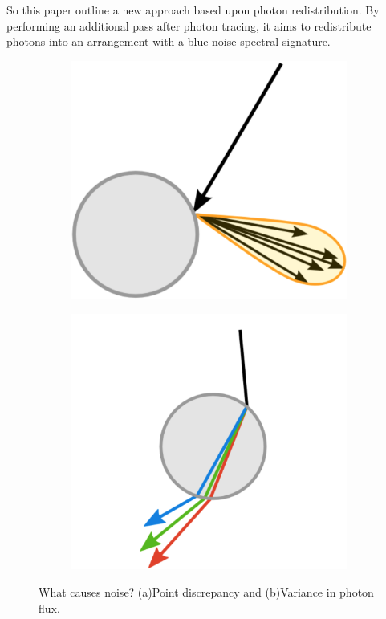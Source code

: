 So this paper outline a new approach based upon photon redistribution. By performing an additional pass after photon tracing, it aims to redistribute photons into an arrangement with a blue noise spectral signature.

\begin{figure}
\begin{center}
	\begin{subfigure}[b]{.48\textwidth}
		\includegraphics[width=1.\textwidth]{graphics/pm/pm-15-1}
		\caption{}
	\end{subfigure}
	\begin{subfigure}[b]{.48\textwidth}
		\includegraphics[width=1.\textwidth]{graphics/pm/pm-15-2}
		\caption{}
	\end{subfigure}
\end{center}
\caption{What causes noise? (a)Point discrepancy and (b)Variance in photon flux.}
\label{f:What-causes-noise}
\end{figure}

